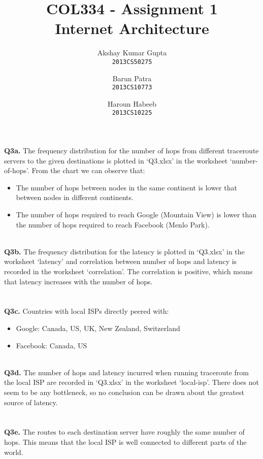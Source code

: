 \documentclass[12pt]{article}
\begin{document}
\title{COL334 - Assignment 1\\ Internet Architecture}
\author{Akshay Kumar Gupta\\\texttt{2013CS50275} \and  Barun Patra\\\texttt{2013CS10773} \and Haroun Habeeb\\\texttt{2013CS10225}}
\date{}
\maketitle
\noindent
{\bfseries Q3a.} The frequency distribution for the number of hops from different traceroute servers to the given destinations is plotted in `Q3.xlsx' in the worksheet `number-of-hops'. From the chart we can observe that:
\begin{itemize}
\item The number of hops between nodes in the same continent is lower that between nodes in different continents.
\item The number of hops required to reach Google (Mountain View) is lower than the number of hops required to reach Facebook (Menlo Park).
\end{itemize}
~ \\
{\bfseries Q3b.} The frequency distribution for the latency is plotted in `Q3.xlsx' in the worksheet `latency' and correlation between number of hops and latency is recorded in the worksheet `correlation'. The correlation is positive, which means that latency increases with the number of hops.
\\ \\ \\
{\bfseries Q3c.} Countries with local ISPs directly peered with:
\begin{itemize}
\item Google: Canada, US, UK, New Zealand, Switzerland
\item Facebook: Canada, US
\end{itemize}
~ \\
{\bfseries Q3d.} The number of hops and latency incurred when running traceroute from the local ISP are recorded in `Q3.xlsx' in the worksheet `local-isp'. There does not seem to be any bottleneck, so no conclusion can be drawn about the greatest source of latency.
\\ \\ \\
{\bfseries Q3e.} The routes to each destination server have roughly the same number of hops. This means that the local ISP is well connected to different parts of the world.
\end{document}
